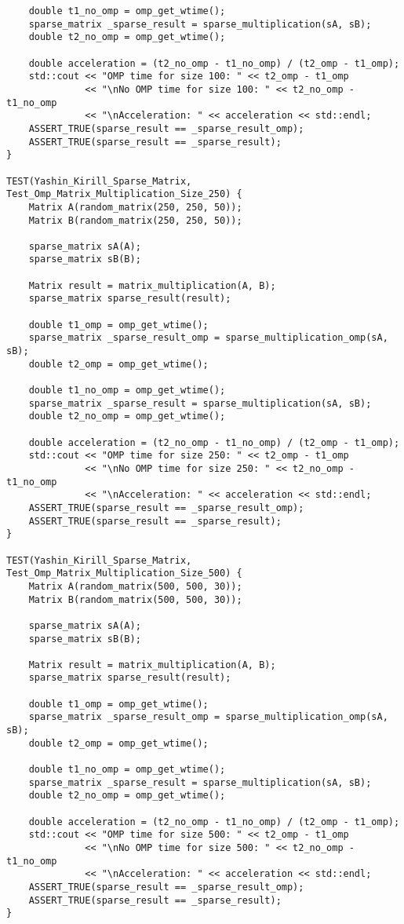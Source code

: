 \documentclass{report}
\begin{document}
\begin{lstlisting}
    double t1_no_omp = omp_get_wtime();
    sparse_matrix _sparse_result = sparse_multiplication(sA, sB);
    double t2_no_omp = omp_get_wtime();

    double acceleration = (t2_no_omp - t1_no_omp) / (t2_omp - t1_omp);
    std::cout << "OMP time for size 100: " << t2_omp - t1_omp
              << "\nNo OMP time for size 100: " << t2_no_omp - t1_no_omp
              << "\nAcceleration: " << acceleration << std::endl;
    ASSERT_TRUE(sparse_result == _sparse_result_omp);
    ASSERT_TRUE(sparse_result == _sparse_result);
}

TEST(Yashin_Kirill_Sparse_Matrix, Test_Omp_Matrix_Multiplication_Size_250) {
    Matrix A(random_matrix(250, 250, 50));
    Matrix B(random_matrix(250, 250, 50));

    sparse_matrix sA(A);
    sparse_matrix sB(B);

    Matrix result = matrix_multiplication(A, B);
    sparse_matrix sparse_result(result);

    double t1_omp = omp_get_wtime();
    sparse_matrix _sparse_result_omp = sparse_multiplication_omp(sA, sB);
    double t2_omp = omp_get_wtime();

    double t1_no_omp = omp_get_wtime();
    sparse_matrix _sparse_result = sparse_multiplication(sA, sB);
    double t2_no_omp = omp_get_wtime();

    double acceleration = (t2_no_omp - t1_no_omp) / (t2_omp - t1_omp);
    std::cout << "OMP time for size 250: " << t2_omp - t1_omp
              << "\nNo OMP time for size 250: " << t2_no_omp - t1_no_omp
              << "\nAcceleration: " << acceleration << std::endl;
    ASSERT_TRUE(sparse_result == _sparse_result_omp);
    ASSERT_TRUE(sparse_result == _sparse_result);
}

TEST(Yashin_Kirill_Sparse_Matrix, Test_Omp_Matrix_Multiplication_Size_500) {
    Matrix A(random_matrix(500, 500, 30));
    Matrix B(random_matrix(500, 500, 30));

    sparse_matrix sA(A);
    sparse_matrix sB(B);

    Matrix result = matrix_multiplication(A, B);
    sparse_matrix sparse_result(result);

    double t1_omp = omp_get_wtime();
    sparse_matrix _sparse_result_omp = sparse_multiplication_omp(sA, sB);
    double t2_omp = omp_get_wtime();

    double t1_no_omp = omp_get_wtime();
    sparse_matrix _sparse_result = sparse_multiplication(sA, sB);
    double t2_no_omp = omp_get_wtime();

    double acceleration = (t2_no_omp - t1_no_omp) / (t2_omp - t1_omp);
    std::cout << "OMP time for size 500: " << t2_omp - t1_omp
              << "\nNo OMP time for size 500: " << t2_no_omp - t1_no_omp
              << "\nAcceleration: " << acceleration << std::endl;
    ASSERT_TRUE(sparse_result == _sparse_result_omp);
    ASSERT_TRUE(sparse_result == _sparse_result);
}

\end{lstlisting}
\end{document}
